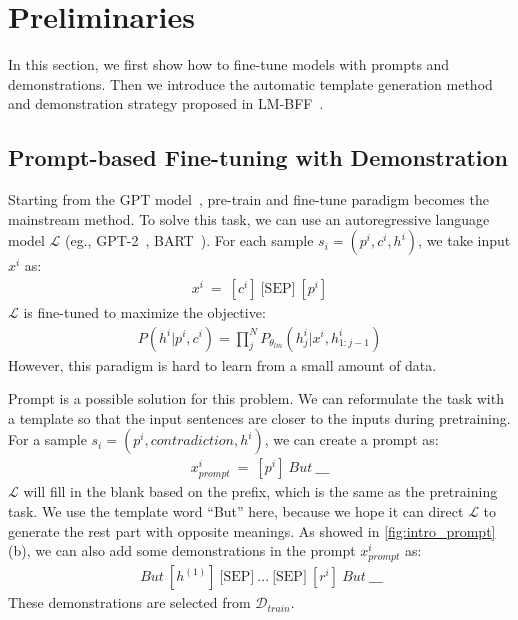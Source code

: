 \section{Preliminaries}

In this section, we first show how to fine-tune models with prompts and demonstrations. Then we introduce the automatic template generation method and demonstration strategy proposed in LM-BFF~\citep{DBLP:conf/acl/GaoFC20}.

\subsection{Prompt-based Fine-tuning with Demonstration}

Starting from the GPT model~\citep{radford2018improving}, pre-train and fine-tune paradigm becomes the mainstream method. To solve this task, we can use an autoregressive language model $\mathcal{L}$ (eg., GPT-2~\citep{radford2019language}, BART~\citep{DBLP:conf/acl/LewisLGGMLSZ20}). For each sample $s_i=(p^i, c^i, h^i)$, we take input $x^i$ as:
\begin{align*}
	x^i\ =\ [c^i]\ \mbox{[SEP]}\ [p^i]
\end{align*}\label{eq:fine}
$\mathcal{L}$ is fine-tuned to maximize the objective:
\begin{align}
	P(h^i | p^i, c^i) = \prod_{j}^{N} P_{\theta_{lm}} (h_{j}^i | x^i, h_{1:j-1}^i)
	\label{eq:obj}
\end{align}
However, this paradigm is hard to learn from a small amount of data. 

Prompt is a possible solution for this problem. We can reformulate the task with a template so that the input sentences are closer to the inputs during pretraining. For a sample $s_i=(p^i, contradiction, h^i)$, we can create a prompt as:
\begin{align*}
	x_{prompt}^i\ =\ [p^i]\ But\ \_\_\_
\end{align*}\label{eq:exp}
$\mathcal{L}$ will fill in the blank based on the prefix, which is the same as the pretraining task. We use the template word ``But'' here, because we hope it can direct $\mathcal{L}$ to generate the rest part with opposite meanings.
As showed in \ref{fig:intro_prompt}(b), we can also add some demonstrations in the prompt $x_{prompt}^i$ as:
\begin{align*}
	[p^{(1)}]\ But\ [h^{(1)}]\ \mbox{[SEP]}\ ...\ \mbox{[SEP]}\ [r^i]\ But\ \_\_\_
\end{align*}\label{eq:expdemo}
These demonstrations are selected from $\mathcal{D}_{train}$.

